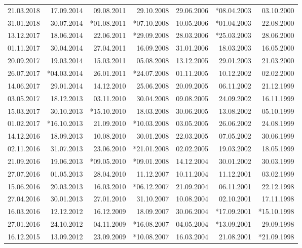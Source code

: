 \documentclass[11pt,a4paper,english,oneside]{book}
\numberwithin{equation}{chapter}
\begin{document}
\begin{table}[h]
\begin{tabular}{r r r r r r r }
						21.03.2018 & 17.09.2014 & 09.08.2011 & 29.10.2008 & 29.06.2006 & *08.04.2003 & 03.10.2000 \\
						31.01.2018 & 30.07.2014 & *01.08.2011 & *07.10.2008 & 10.05.2006 & *01.04.2003 & 22.08.2000 \\
						13.12.2017 & 18.06.2014 & 22.06.2011 & *29.09.2008 & 28.03.2006 & *25.03.2003 & 28.06.2000 \\
						01.11.2017 & 30.04.2014 & 27.04.2011 & 16.09.2008 & 31.01.2006 & 18.03.2003 & 16.05.2000 \\
						20.09.2017 & 19.03.2014 & 15.03.2011 & 05.08.2008 & 13.12.2005 & 29.01.2003 & 21.03.2000 \\
						26.07.2017 & *04.03.2014 & 26.01.2011 & *24.07.2008 & 01.11.2005 & 10.12.2002 & 02.02.2000 \\
						14.06.2017 & 29.01.2014 & 14.12.2010 & 25.06.2008 & 20.09.2005 & 06.11.2002 & 21.12.1999 \\
						03.05.2017 & 18.12.2013 & 03.11.2010 & 30.04.2008 & 09.08.2005 & 24.09.2002 & 16.11.1999 \\
						15.03.2017 & 30.10.2013 & *15.10.2010 & 18.03.2008 & 30.06.2005 & 13.08.2002 & 05.10.1999 \\
						01.02.2017 & *16.10.2013 & 21.09.2010 & *10.03.2008 & 03.05.2005 & 26.06.2002 & 24.08.1999 \\
						14.12.2016 & 18.09.2013 & 10.08.2010 & 30.01.2008 & 22.03.2005 & 07.05.2002 & 30.06.1999 \\
						02.11.2016 & 31.07.2013 & 23.06.2010 & *21.01.2008 & 02.02.2005 & 19.03.2002 & 18.05.1999 \\
						21.09.2016 & 19.06.2013 & *09.05.2010 & *09.01.2008 & 14.12.2004 & 30.01.2002 & 30.03.1999 \\
						27.07.2016 & 01.05.2013 & 28.04.2010 & 11.12.2007 & 10.11.2004 & 11.12.2001 & 03.02.1999 \\
						15.06.2016 & 20.03.2013 & 16.03.2010 & *06.12.2007 & 21.09.2004 & 06.11.2001 & 22.12.1998 \\
						27.04.2016 & 30.01.2013 & 27.01.2010 & 31.10.2007 & 10.08.2004 & 02.10.2001 & 17.11.1998 \\
						16.03.2016 & 12.12.2012 & 16.12.2009 & 18.09.2007 & 30.06.2004 & *17.09.2001 & *15.10.1998 \\
						27.01.2016 & 24.10.2012 & 04.11.2009 & *16.08.2007 & 04.05.2004 & *13.09.2001 & 29.09.1998 \\
						16.12.2015 & 13.09.2012 & 23.09.2009 & *10.08.2007 & 16.03.2004 & 21.08.2001 & *21.09.1998 \\

\end{tabular}
\end{table}
\end{document}

